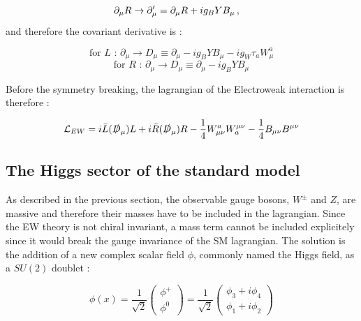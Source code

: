 \begin{equation}
    \partial_{\mu}R \rightarrow \partial_{\mu}' = \partial_{\mu}R + ig_B Y B_{\mu} \msep
\end{equation}
and therefore the covariant derivative is :

\begin{equation}
    \text{for $L$ :       } \partial_{\mu} \rightarrow D_{\mu} \equiv \partial_{\mu} - ig_B Y B_{\mu} - ig_W \tau_a W_{\mu}^a
\end{equation}
\begin{equation}
    \text{for $R$ :       } \partial_{\mu} \rightarrow D_{\mu} \equiv \partial_{\mu} - ig_B Y B_{\mu}
\end{equation}

Before the symmetry breaking, the lagrangian of the Electroweak interaction is therefore :

\begin{equation}
    \mathcal{L}_{EW} = i\Bar{L}(\slashed{D}_{\mu})L + i\Bar{R}(\slashed{D}_{\mu})R -\frac{1}{4}W_{\mu\nu}^a W^{\mu\nu}_a - \frac{1}{4}B_{\mu\nu}B^{\mu\nu}
\end{equation}

\subsection{The Higgs sector of the standard model}
\label{sec:SM_higgs}

As described in the previous section, the observable gauge bosons, $W^{\pm}$ and $Z$, are massive and therefore their masses have to be included in the lagrangian. Since the EW theory is not chiral invariant, a mass term cannot be included explicitely since it would break the gauge invariance of the SM lagrangian. The solution \cite{PhysRevLett.13.508} is the addition of a new complex scalar field $\phi$, commonly named the Higgs field, as a $SU(2)$ doublet :

\begin{equation}
    \phi(x) = \frac{1}{\sqrt{2}} \begin{pmatrix} \phi^+ \\ \phi^0 \end{pmatrix} = \frac{1}{\sqrt{2}} \begin{pmatrix} \phi_3 + i \phi_4 \\ \phi_1 + i \phi_2 \end{pmatrix}
\end{equation}

